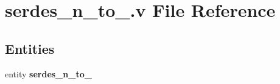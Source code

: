 \section{serdes\-\_\-n\-\_\-to\-\_.\-v File Reference}
\label{serdes__n__to__1_8v}
\subsection*{Entities}
\begin{DoxyCompactItemize}
\item 
entity {\bf serdes\-\_\-n\-\_\-to\-\_}
\end{DoxyCompactItemize}
